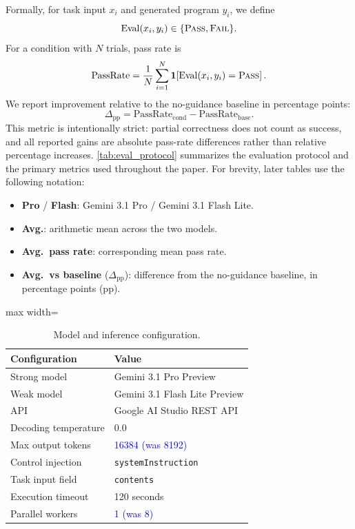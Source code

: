 \documentclass{article}
\newcommand{\blue}[1]{\textcolor{blue}{#1}}
\begin{document}
Formally, for task input $x_i$ and generated program $y_i$, we define
\begin{equation}
\mathrm{Eval}(x_i,y_i)\in\{\textsc{Pass},\textsc{Fail}\}.
\end{equation}
For a condition with $N$ trials, pass rate is
\begin{equation}
\mathrm{PassRate}=\frac{1}{N}\sum_{i=1}^{N}\mathbf{1}\!\left[\mathrm{Eval}(x_i,y_i)=\textsc{Pass}\right].
\end{equation}
We report improvement relative to the no-guidance baseline in percentage points:
\begin{equation}
\Delta_{\mathrm{pp}}=\mathrm{PassRate}_{\mathrm{cond}}-\mathrm{PassRate}_{\mathrm{base}}.
\end{equation}
This metric is intentionally strict: partial correctness does not count as success, and all reported gains are absolute pass-rate differences rather than relative percentage increases. 
\cref{tab:eval_protocol} summarizes the evaluation protocol and the primary metrics used throughout the paper.
For brevity, later tables use the following notation:
\begin{itemize}[leftmargin=1.2em, itemsep=0.15em, topsep=0.2em, parsep=0pt, partopsep=0pt]
    \item \textbf{Pro} / \textbf{Flash}: Gemini 3.1 Pro / Gemini 3.1 Flash Lite.
    \item \textbf{Avg.}: arithmetic mean across the two models.
    \item \textbf{Avg.\ pass rate}: corresponding mean pass rate.
    \item \textbf{Avg.\ vs baseline} ($\Delta_{\mathrm{pp}}$): difference from the no-guidance baseline, in percentage points (pp).
\end{itemize}

\begin{table}[t]
\centering
\caption{Model and inference configuration.}
\label{tab:model_config}
\begin{adjustbox}{max width=\columnwidth}
\begin{tabular}{ll}
\toprule
\textbf{Configuration} & \textbf{Value} \\
\midrule
Strong model & Gemini 3.1 Pro Preview \\
Weak model & Gemini 3.1 Flash Lite Preview \\
API & Google AI Studio REST API \\
Decoding temperature & 0.0 \\
Max output tokens & \blue{16384 (was 8192)} \\
Control injection & \texttt{systemInstruction} \\
Task input field & \texttt{contents} \\
Execution timeout & 120 seconds \\
Parallel workers & \blue{1 (was 8)} \\
\bottomrule
\end{tabular}
\end{adjustbox}
\end{table}
\end{document}
